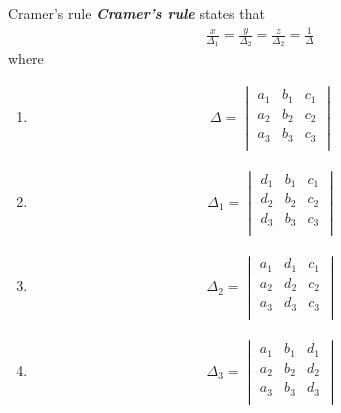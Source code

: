 \documentclass[titlepage, 12pt]{book}
\begin{document}
\begin{definition}{Cramer's rule}{}
    \textbf{\textit{Cramer's rule}} states that
    \begin{align*}
        \frac{x}{\Delta_1} = \frac{y}{\Delta_2} = \frac{z}{\Delta_2} = \frac{1}{\Delta}
    \end{align*}
    where
    \begin{enumerate}
        \item 
            \begin{align*}
                \Delta =
                \begin{vmatrix}
                    a_1 & b_1 & c_1\\
                    a_2 & b_2 & c_2\\
                    a_3 & b_3 & c_3\\
                \end{vmatrix}
            \end{align*}
        \item 
            \begin{align*}
                \Delta_1 =
                \begin{vmatrix}
                    d_1 & b_1 & c_1\\
                    d_2 & b_2 & c_2\\
                    d_3 & b_3 & c_3\\
                \end{vmatrix}
            \end{align*}
        \item 
            \begin{align*}
                \Delta_2 =
                \begin{vmatrix}
                    a_1 & d_1 & c_1\\
                    a_2 & d_2 & c_2\\
                    a_3 & d_3 & c_3\\
                \end{vmatrix}
            \end{align*}
        \item 
            \begin{align*}
                \Delta_3 =
                \begin{vmatrix}
                    a_1 & b_1 & d_1\\
                    a_2 & b_2 & d_2\\
                    a_3 & b_3 & d_3\\
                \end{vmatrix}
            \end{align*}
    \end{enumerate}
\end{definition}
\end{document}
